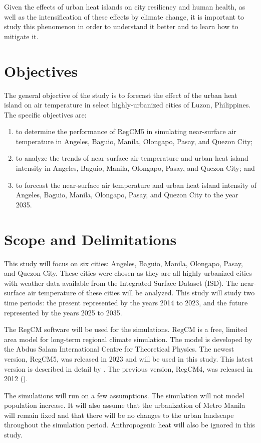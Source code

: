 	Given the effects of urban heat islands on city resiliency and human health,
		as well as the intensification of these effects by climate change,
		it is important to study this phenomenon in order to understand it better and to learn how to mitigate it.

\section{Objectives}
	The general objective of the study is to forecast the effect of the urban heat island on air temperature in select highly-urbanized cities of Luzon, Philippines.
	The specific objectives are:
	\begin{enumerate}
		\item to determine the performance of RegCM5 in simulating near-surface air temperature in Angeles, Baguio, Manila, Olongapo, Pasay, and Quezon City;
		\item to analyze the trends of near-surface air temperature and urban heat island intensity in Angeles, Baguio, Manila, Olongapo, Pasay, and Quezon City; and
		\item to forecast the near-surface air temperature and urban heat island intensity of Angeles, Baguio, Manila, Olongapo, Pasay, and Quezon City to the year 2035.
	\end{enumerate}
	

\section{Scope and Delimitations}
	This study will focus on six cities: Angeles, Baguio, Manila, Olongapo, Pasay, and Quezon City.
	These cities were chosen as they are all highly-urbanized cities with weather data available from the Integrated Surface Dataset (ISD).
	The near-surface air temperature of these cities will be analyzed.
	This study will study two time periods: 
		the present represented by the years 2014 to 2023, 
		and the future represented by the years 2025 to 2035.

	The RegCM software will be used for the simulations.
	RegCM is a free, limited area model for long-term regional climate simulation.
	The model is developed by the Abdus Salam International Centre for Theoretical Physics.
	The newest version, RegCM5, was released in 2023 and will be used in this study.
	This latest version is described in detail by \textcite{Giorgi2023}. 
	The previous version, RegCM4, was released in 2012 (\textcite{Giorgi2012}).
	
	The simulations will run on a few assumptions.
	The simulation will not model population increase.
	It will also assume that the urbanization of Metro Manila will remain fixed and that there will be no changes to the urban landscape throughout the simulation period.
	Anthropogenic heat will also be ignored in this study.